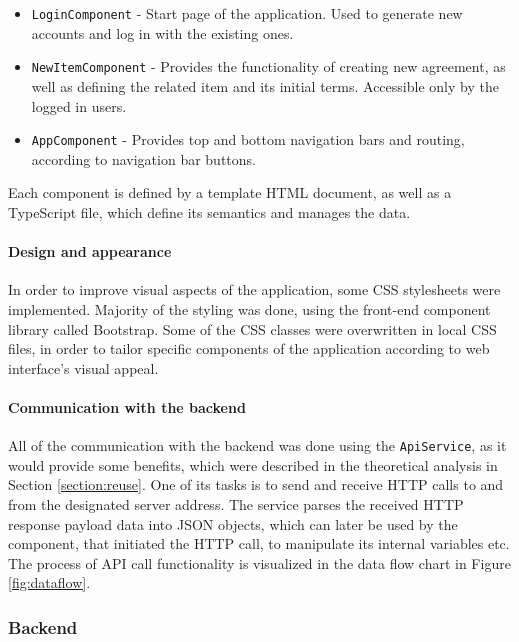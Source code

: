 \begin{itemize}
\item \texttt{LoginComponent} - Start page of the application. Used to generate new accounts and log in with the existing ones.

\item \texttt{NewItemComponent} - Provides the functionality of creating new agreement, as well as defining the related item and its initial terms. Accessible only by the logged in users.

\item \texttt{AppComponent} - Provides top and bottom navigation bars and routing, according to navigation bar buttons.
\end{itemize}

Each component is defined by a template HTML document, as well as a TypeScript file, which define its semantics and manages the data.

\paragraph{Design and appearance}
In order to improve visual aspects of the application, some CSS stylesheets were implemented. Majority of the styling was done, using the front-end component library called Bootstrap. Some of the CSS classes were overwritten in local CSS files, in order to tailor specific components of the application according to web interface's visual appeal.

\paragraph{Communication with the backend}
All of the communication with the backend was done using the \texttt{ApiService}, as it would provide some benefits, which were described in the theoretical analysis in Section \ref{section:reuse}. One of its tasks is to send and receive HTTP calls to and from the designated server address. The service parses the received HTTP response payload data into JSON objects, which can later be used by the component, that initiated the HTTP call, to manipulate its internal variables etc. The process of API call functionality is visualized in the data flow chart in Figure \ref{fig:dataflow}.

\subsubsection{Backend} \label{section:backend}

